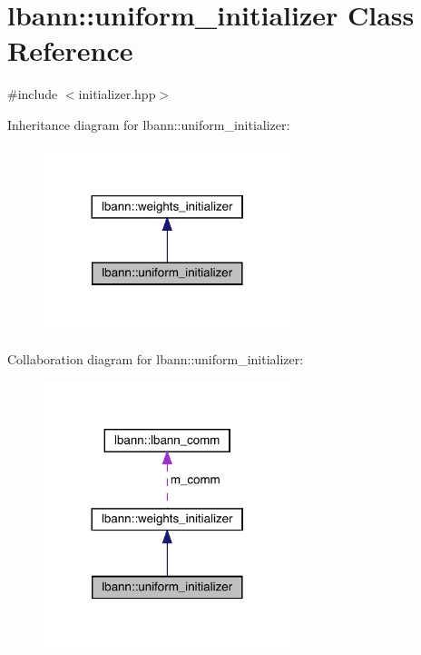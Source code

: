\hypertarget{classlbann_1_1uniform__initializer}{}\section{lbann\+:\+:uniform\+\_\+initializer Class Reference}
\label{classlbann_1_1uniform__initializer}


{\ttfamily \#include $<$initializer.\+hpp$>$}



Inheritance diagram for lbann\+:\+:uniform\+\_\+initializer\+:\nopagebreak
\begin{figure}[H]
\begin{center}
\leavevmode
\includegraphics[width=204pt]{classlbann_1_1uniform__initializer__inherit__graph}
\end{center}
\end{figure}


Collaboration diagram for lbann\+:\+:uniform\+\_\+initializer\+:\nopagebreak
\begin{figure}[H]
\begin{center}
\leavevmode
\includegraphics[width=204pt]{classlbann_1_1uniform__initializer__coll__graph}
\end{center}
\end{figure}
